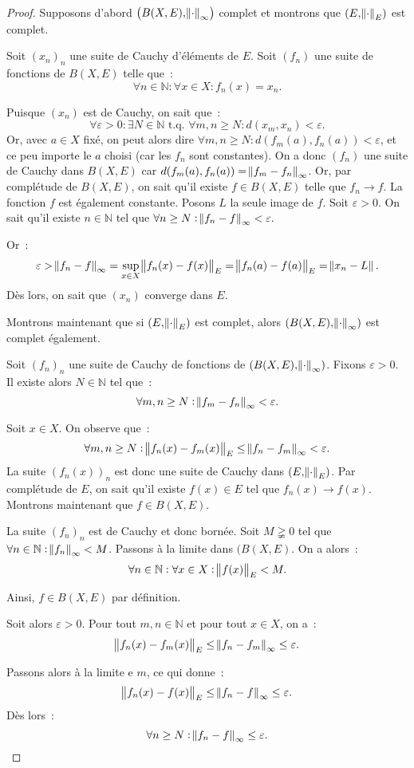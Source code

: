 \documentclass{report}
\theoremstyle{definition}
\theoremstyle{remark}
\newcommand{\N}{\mathbb N}
\newcommand{\tq}{\text{ t.q. }}
\begin{document}
			\begin{proof} Supposons d'abord $\left(B(X, E), \norm \cdot_\infty\right)$ complet et montrons que $(E, \norm \cdot_E)$ est complet.

			Soit $(x_n)_n$ une suite de Cauchy d'éléments de $E$. Soit $(f_n)$ une suite de fonctions de $B(X, E)$ telle que~:
			\[\forall n \in \N : \forall x \in X : f_n(x) = x_n.\]

			Puisque $(x_n)$ est de Cauchy, on sait que~:
			\[\forall \varepsilon > 0 : \exists N \in \N \tq \forall m, n \geq N : d(x_m, x_n) < \varepsilon.\]
			Or, avec $a \in X$ fixé, on peut alors dire $\forall m, n \geq N : d(f_m(a), f_n(a)) < \varepsilon$, et ce peu importe le $a$ choisi (car les
			$f_n$ sont constantes). On a donc $(f_n)$ une suite de Cauchy dans $B(X, E)$ car $d(f_m(a), f_n(a)) = \norm {f_m - f_n}_\infty$. Or, par
			complétude de $B(X, E)$, on sait qu'il existe $f \in B(X, E)$ telle que $f_n \to f$. La fonction $f$ est également constante. Posons $L$ la seule
			image de $f$. Soit $\varepsilon > 0$. On sait qu'il existe $n \in \N$ tel que $\forall n \geq N : \norm {f_n - f}_\infty < \varepsilon.$

			Or~:
			\[\varepsilon > \norm {f_n - f}_\infty = \sup_{x \in X} \norm {f_n(x) - f(x)}_E = \norm {f_n(a) - f(a)}_E = \norm {x_n - L}.\]
			Dès lors, on sait que $(x_n)$ converge dans $E$.

			Montrons maintenant que si $(E, \norm \cdot_E)$ est complet, alors $(B(X, E), \norm \cdot_\infty)$ est complet également.

			Soit $(f_n)_n$ une suite de Cauchy de fonctions de $(B(X, E), \norm \cdot_\infty)$. Fixons $\varepsilon > 0$. Il existe alors $N \in \N$ tel que~:
			\[\forall m, n \geq N : \norm {f_m - f_n}_\infty < \varepsilon.\]

			Soit $x \in X$. On observe que~:
			\[\forall m, n \geq N : \norm {f_n(x) - f_m(x)}_E \leq \norm {f_n - f_m}_\infty < \varepsilon.\]
			La suite $(f_n(x))_n$ est donc une suite de Cauchy dans $(E, \norm \cdot_E)$. Par complétude de $E$, on sait qu'il existe $f(x) \in E$ tel que
			$f_n(x) \to f(x)$. Montrons maintenant que $f \in B(X, E)$.

			La suite $(f_n)_n$ est de Cauchy et donc bornée. Soit $M \gneqq 0$ tel que $\forall n \in \N : \norm {f_n}_\infty < M$. Passons à la limite dans
			$(B(X, E)$. On a alors~:
			\[\forall n \in \N : \forall x \in X : \norm {f(x)}_E < M.\]

			Ainsi, $f \in B(X, E)$ par définition.

			Soit alors $\varepsilon > 0$. Pour tout $m, n \in \N$ et pour tout $x \in X$, on a~:
			\[\norm {f_n(x) - f_m(x)}_E  \leq \norm {f_n - f_m}_\infty \leq \varepsilon.\]

			Passons alors à la limite e $m$, ce qui donne~:
			\[\norm {f_n(x) - f(x)}_E \leq \norm {f_n - f}_\infty \leq \varepsilon.\]
			Dès lors~:
			\[\forall n \geq N : \norm {f_n - f}_\infty \leq \varepsilon.\]
			\end{proof}
\end{document}
